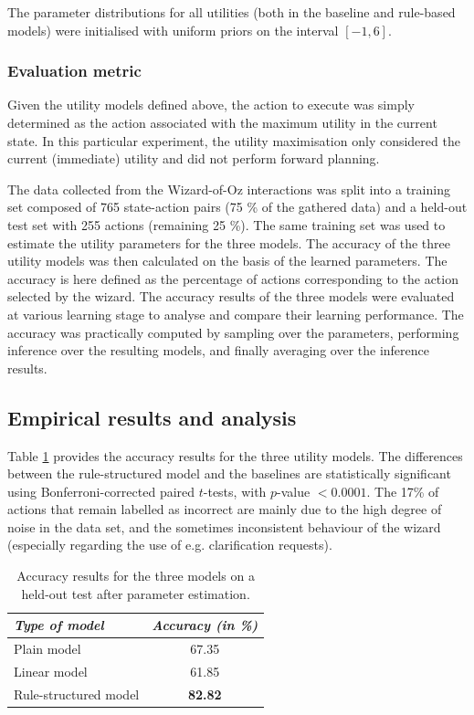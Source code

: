 The parameter distributions for all utilities (both in the baseline and rule-based models) were initialised with uniform priors on the interval $[-1,6]$.

\subsubsection*{Evaluation metric}

Given the utility models defined above, the action to execute was simply determined as the action associated with the maximum utility in the current state. In this particular experiment, the utility maximisation only considered the current (immediate) utility and did not perform forward planning.

The data collected from the Wizard-of-Oz interactions was split into a training set composed of 765 state-action pairs (75 \% of the gathered data) and a held-out test set with 255 actions (remaining 25 \%). The same training set was used to estimate the utility parameters for the three models. The accuracy of the three utility models was then calculated on the basis of the learned parameters. The accuracy is here defined as the percentage of actions corresponding to the action selected by the wizard.  The accuracy results of the three models were evaluated at various learning stage to analyse and compare their learning performance. The accuracy was practically computed by sampling over the parameters, performing inference over the resulting models, and finally averaging over the inference results.  

\subsection{Empirical results and analysis}
\label{sec:wozlearning-experiments-results}

Table \ref{table} provides the accuracy results for the three utility models. The differences between the rule-structured model and the baselines are statistically significant using Bonferroni-corrected paired $t$-tests, with $p$-value $< 0.0001$.  The 17\% of actions that remain labelled as incorrect are mainly due to the high degree of noise in the data set, and the sometimes inconsistent behaviour of the wizard (especially regarding the use of e.g. clarification requests). 

\begin{table}[h]
\begin{center}
\begin{tabular}{|l|c|} \hline
\textit{Type of model} & \textit{Accuracy (in \%) } \\ \hline \hline
Plain model & 67.35 \\ \hline
Linear model & 61.85 \\ \hline
Rule-structured model & \textbf{82.82} \\ \hline
\end{tabular}
\end{center}
\vspace{-2mm}
\caption{Accuracy results for the three models on a held-out test after parameter estimation.}
\vspace{-2mm}
\label{table}
\end{table}


